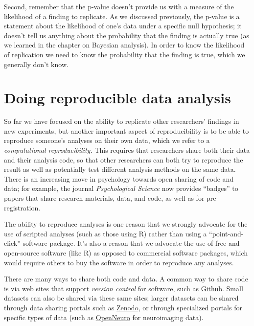 \documentclass[12pt,]{book}
\theoremstyle{definition}
\theoremstyle{definition}
\theoremstyle{definition}
\theoremstyle{remark}
\begin{document}
Second, remember that the p-value doesn't provide us with a measure of the likelihood of a finding to replicate. As we discussed previously, the p-value is a statement about the likelihood of one's data under a specific null hypothesis; it doesn't tell us anything about the probability that the finding is actually true (as we learned in the chapter on Bayesian analysis). In order to know the likelihood of replication we need to know the probability that the finding is true, which we generally don't know.

\hypertarget{doing-reproducible-data-analysis}{%
\section{Doing reproducible data analysis}\label{doing-reproducible-data-analysis}}

So far we have focused on the ability to replicate other researchers' findings in new experiments, but another important aspect of reproducibility is to be able to reproduce someone's analyses on their own data, which we refer to a \emph{computational reproducibility.} This requires that researchers share both their data and their analysis code, so that other researchers can both try to reproduce the result as well as potentially test different analysis methods on the same data. There is an increasing move in psychology towards open sharing of code and data; for example, the journal \emph{Psychological Science} now provides ``badges'' to papers that share research materials, data, and code, as well as for pre-registration.

The ability to reproduce analyses is one reason that we strongly advocate for the use of scripted analyses (such as those using R) rather than using a ``point-and-click'' software package. It's also a reason that we advocate the use of free and open-source software (like R) as opposed to commercial software packages, which would require others to buy the software in order to reproduce any analyses.

There are many ways to share both code and data. A common way to share code is via web sites that support \emph{version control} for software, such as \href{http://github.com}{Github}. Small datasets can also be shared via these same sites; larger datasets can be shared through data sharing portals such as \href{https://zenodo.org/}{Zenodo}, or through specialized portals for specific types of data (such as \href{http://openneuro.org}{OpenNeuro} for neuroimaging data).
\end{document}
